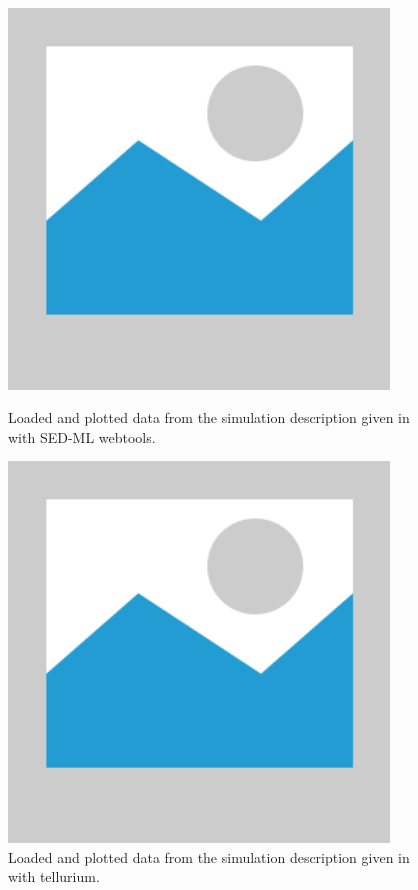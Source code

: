 \begin{figure}
    \centering
    \begin{minipage}{0.45\textwidth}
        \centering
        \includegraphics[width=0.9\textwidth]{examples/placeholder}
        \caption{Loaded and plotted data from the simulation description given in  with SED-ML webtools.}
    \end{minipage}\hfill
    \begin{minipage}{0.45\textwidth}
        \centering
        \includegraphics[width=0.9\textwidth]{examples/placeholder}
        \caption{Loaded and plotted data from the simulation description given in  with tellurium.}
    \end{minipage}
    \label{fig:reading-data-csv}
\end{figure}

